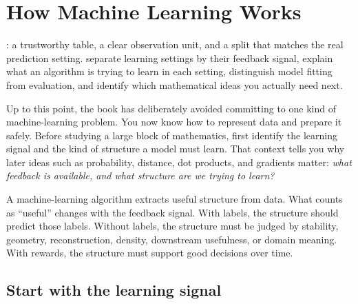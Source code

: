 \chapter{How Machine Learning Works}
\label{ch:learning}

\chapterguide%
  {: a trustworthy table, a clear observation unit, and a split that matches the real prediction setting.}
  {separate learning settings by their feedback signal, explain what an algorithm is trying to learn in each setting, distinguish model fitting from evaluation, and identify which mathematical ideas you actually need next.}

Up to this point, the book has deliberately avoided committing to one kind of machine-learning problem. You now know how to represent data and prepare it safely. Before studying a large block of mathematics, first identify the learning signal and the kind of structure a model must learn. That context tells you why later ideas such as probability, distance, dot products, and gradients matter: \emph{what feedback is available, and what structure are we trying to learn?}

\begin{keyidea}
A machine-learning algorithm extracts useful structure from data. What counts as ``useful'' changes with the feedback signal. With labels, the structure should predict those labels. Without labels, the structure must be judged by stability, geometry, reconstruction, density, downstream usefulness, or domain meaning. With rewards, the structure must support good decisions over time.
\end{keyidea}

\section{Start with the learning signal}

